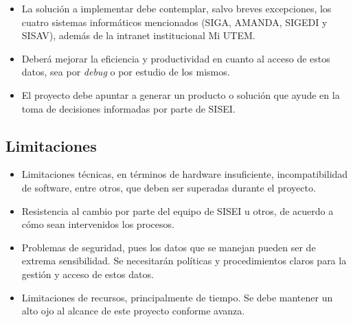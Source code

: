 \begin{itemize}
	\item La solución a implementar debe contemplar, salvo breves excepciones, los cuatro sistemas informáticos mencionados (SIGA, AMANDA, SIGEDI y SISAV), además de la intranet institucional Mi UTEM.
	\item Deberá mejorar la eficiencia y productividad en cuanto al acceso de estos datos, sea por \textit{debug} o por estudio de los mismos.
	\item El proyecto debe apuntar a generar un producto o solución que ayude en la toma de decisiones informadas por parte de SISEI.
\end{itemize}

\subsection{Limitaciones}
\begin{itemize}
	\item Limitaciones técnicas, en términos de hardware insuficiente, incompatibilidad de software, entre otros, que deben ser superadas durante el proyecto.
	\item Resistencia al cambio por parte del equipo de SISEI u otros, de acuerdo a cómo sean intervenidos los procesos.
	\item Problemas de seguridad, pues los datos que se manejan pueden ser de extrema sensibilidad. Se necesitarán políticas y procedimientos claros para la gestión y acceso de estos datos.
	\item Limitaciones de recursos, principalmente de tiempo. Se debe mantener un alto ojo al alcance de este proyecto conforme avanza.
\end{itemize}

\clearpage
